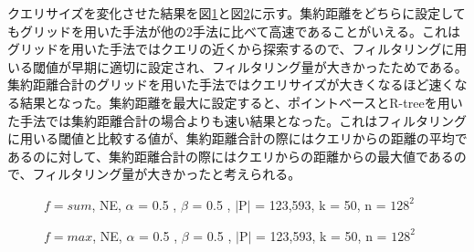 \documentclass{deimj}
\begin{document}

クエリサイズを変化させた結果を図\ref{fig:sum-querySize}と図\ref{fig:max-querySize}に示す。集約距離をどちらに設定してもグリッドを用いた手法が他の2手法に比べて高速であることがいえる。これはグリッドを用いた手法ではクエリの近くから探索するので、フィルタリングに用いる閾値が早期に適切に設定され、フィルタリング量が大きかったためである。集約距離合計のグリッドを用いた手法ではクエリサイズが大きくなるほど速くなる結果となった。集約距離を最大に設定すると、ポイントベースとR-treeを用いた手法では集約距離合計の場合よりも速い結果となった。これはフィルタリングに用いる閾値と比較する値が、集約距離合計の際にはクエリからの距離の平均であるのに対して、集約距離合計の際にはクエリからの距離からの最大値であるので、フィルタリング量が大きかったと考えられる。

\begin{figure}[H]
	\centering
    \caption{$f=sum$, NE, $\alpha$ = 0.5 , $\beta$ = 0.5 , $\mid$P$\mid$ = 123,593, k = 50, n = $128^2$}
    \label{fig:sum-querySize}
\end{figure}

\begin{figure}[H]
	\centering
    \caption{$f=max$, NE, $\alpha$ = 0.5 , $\beta$ = 0.5 , $\mid$P$\mid$ = 123,593, k = 50, n = $128^2$}
    \label{fig:max-querySize}
\end{figure}
\end{document}
